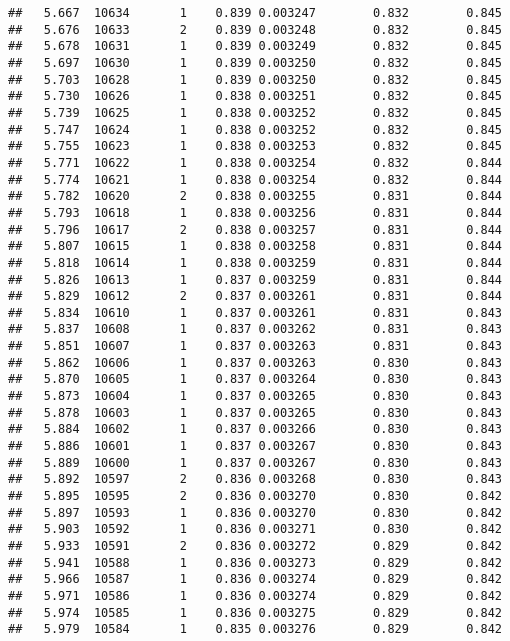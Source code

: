 \documentclass[
]{book}
\begin{document}
\begin{verbatim}
##   5.667  10634       1    0.839 0.003247        0.832        0.845
##   5.676  10633       2    0.839 0.003248        0.832        0.845
##   5.678  10631       1    0.839 0.003249        0.832        0.845
##   5.697  10630       1    0.839 0.003250        0.832        0.845
##   5.703  10628       1    0.839 0.003250        0.832        0.845
##   5.730  10626       1    0.838 0.003251        0.832        0.845
##   5.739  10625       1    0.838 0.003252        0.832        0.845
##   5.747  10624       1    0.838 0.003252        0.832        0.845
##   5.755  10623       1    0.838 0.003253        0.832        0.845
##   5.771  10622       1    0.838 0.003254        0.832        0.844
##   5.774  10621       1    0.838 0.003254        0.832        0.844
##   5.782  10620       2    0.838 0.003255        0.831        0.844
##   5.793  10618       1    0.838 0.003256        0.831        0.844
##   5.796  10617       2    0.838 0.003257        0.831        0.844
##   5.807  10615       1    0.838 0.003258        0.831        0.844
##   5.818  10614       1    0.838 0.003259        0.831        0.844
##   5.826  10613       1    0.837 0.003259        0.831        0.844
##   5.829  10612       2    0.837 0.003261        0.831        0.844
##   5.834  10610       1    0.837 0.003261        0.831        0.843
##   5.837  10608       1    0.837 0.003262        0.831        0.843
##   5.851  10607       1    0.837 0.003263        0.831        0.843
##   5.862  10606       1    0.837 0.003263        0.830        0.843
##   5.870  10605       1    0.837 0.003264        0.830        0.843
##   5.873  10604       1    0.837 0.003265        0.830        0.843
##   5.878  10603       1    0.837 0.003265        0.830        0.843
##   5.884  10602       1    0.837 0.003266        0.830        0.843
##   5.886  10601       1    0.837 0.003267        0.830        0.843
##   5.889  10600       1    0.837 0.003267        0.830        0.843
##   5.892  10597       2    0.836 0.003268        0.830        0.843
##   5.895  10595       2    0.836 0.003270        0.830        0.842
##   5.897  10593       1    0.836 0.003270        0.830        0.842
##   5.903  10592       1    0.836 0.003271        0.830        0.842
##   5.933  10591       2    0.836 0.003272        0.829        0.842
##   5.941  10588       1    0.836 0.003273        0.829        0.842
##   5.966  10587       1    0.836 0.003274        0.829        0.842
##   5.971  10586       1    0.836 0.003274        0.829        0.842
##   5.974  10585       1    0.836 0.003275        0.829        0.842
##   5.979  10584       1    0.835 0.003276        0.829        0.842

\end{verbatim}
\end{document}
